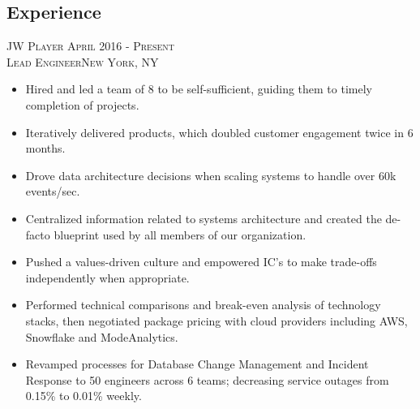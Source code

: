 \documentclass[oneside, final]{scrartcl}
\begin{document}
\begin{center}
\section{Experience}
\textsc{JW Player \hfill April 2016 - Present\\}
\textsc{Lead Engineer\hfill New York, NY\\}
\begin{itemize}
    \vspace{-4pt}
	\setlength{\itemsep}{1pt}
	\setlength{\parskip}{0pt}
	\setlength{\parsep}{0pt}
	\setlength{\leftmargin}{-5mm}
	\item Hired and led a team of 8 to be self-sufficient, guiding them to timely completion of projects.
	\item Iteratively delivered products, which doubled customer engagement twice in 6 months.
	\item Drove data architecture decisions when scaling systems to handle over 60k events/sec.
	\item Centralized information related to systems architecture and created the de-facto blueprint used by all members of our organization.
	\item Pushed a values-driven culture and empowered IC's to make trade-offs independently when appropriate. 
	\item Performed technical comparisons and break-even analysis of technology stacks, then negotiated package pricing with cloud providers including AWS, Snowflake and ModeAnalytics.
	\item Revamped processes for Database Change Management and Incident Response to 50 engineers across 6 teams; decreasing service outages from 0.15\% to 0.01\% weekly.
\end{itemize}


\end{center}
\end{document}
